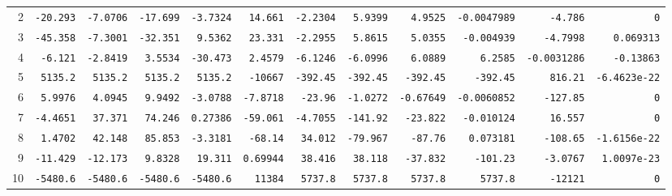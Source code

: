 \begin{landscape}
\begin{tabular}{rrrrrrrrrrrr}
2 & \texttt{-20.293} & \texttt{-7.0706} & \texttt{-17.699} & \texttt{-3.7324} & \texttt{14.661} & \texttt{-2.2304} & \texttt{5.9399} & \texttt{4.9525} & \texttt{-0.0047989} & \texttt{-4.786} & \texttt{0} \\

3 & \texttt{-45.358} & \texttt{-7.3001} & \texttt{-32.351} & \texttt{9.5362} & \texttt{23.331} & \texttt{-2.2955} & \texttt{5.8615} & \texttt{5.0355} & \texttt{-0.004939} & \texttt{-4.7998} & \texttt{0.069313} \\

4 & \texttt{-6.121} & \texttt{-2.8419} & \texttt{3.5534} & \texttt{-30.473} & \texttt{2.4579} & \texttt{-6.1246} & \texttt{-6.0996} & \texttt{6.0889} & \texttt{6.2585} & \texttt{-0.0031286} & \texttt{-0.13863} \\

5 & \texttt{5135.2} & \texttt{5135.2} & \texttt{5135.2} & \texttt{5135.2} & \texttt{-10667} & \texttt{-392.45} & \texttt{-392.45} & \texttt{-392.45} & \texttt{-392.45} & \texttt{816.21} & \texttt{-6.4623e-22} \\

6 & \texttt{5.9976} & \texttt{4.0945} & \texttt{9.9492} & \texttt{-3.0788} & \texttt{-7.8718} & \texttt{-23.96} & \texttt{-1.0272} & \texttt{-0.67649} & \texttt{-0.0060852} & \texttt{-127.85} & \texttt{0} \\

7 & \texttt{-4.4651} & \texttt{37.371} & \texttt{74.246} & \texttt{0.27386} & \texttt{-59.061} & \texttt{-4.7055} & \texttt{-141.92} & \texttt{-23.822} & \texttt{-0.010124} & \texttt{16.557} & \texttt{0} \\

8 & \texttt{1.4702} & \texttt{42.148} & \texttt{85.853} & \texttt{-3.3181} & \texttt{-68.14} & \texttt{34.012} & \texttt{-79.967} & \texttt{-87.76} & \texttt{0.073181} & \texttt{-108.65} & \texttt{-1.6156e-22} \\

9 & \texttt{-11.429} & \texttt{-12.173} & \texttt{9.8328} & \texttt{19.311} & \texttt{0.69944} & \texttt{38.416} & \texttt{38.118} & \texttt{-37.832} & \texttt{-101.23} & \texttt{-3.0767} & \texttt{1.0097e-23} \\

10 & \texttt{-5480.6} & \texttt{-5480.6} & \texttt{-5480.6} & \texttt{-5480.6} & \texttt{11384} & \texttt{5737.8} & \texttt{5737.8} & \texttt{5737.8} & \texttt{5737.8} & \texttt{-12121} & \texttt{0} \\


\end{tabular}
\end{landscape}
